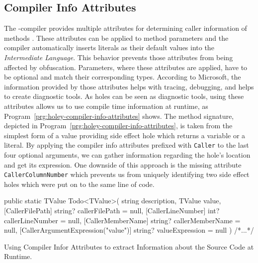 \subsection{Compiler Info Attributes}
\label{sec:holey-compiler-info-attributes}
The \CS-compiler provides multiple attributes for determining caller information of methods \cite{microsoft_attributes_2022}.
These attributes can be applied to method parameters and the compiler automatically inserts literals as their default values into the \emph{Intermediate Language}.
This behavior prevents those attributes from being affected by obfuscation.
Parameters, where these attributes are applied, have to be optional and match their corresponding types.
According to Microsoft, the information provided by those attributes helps with tracing, debugging, and helps to create diagnostic tools.
As holes can be seen as diagnostic tools, using these attributes allows us to use compile time information at runtime, as Program~\ref{prg:holey-compiler-info-attributes} shows.
The method signature, depicted in Program~\ref{prg:holey-compiler-info-attributes}, is taken from the simplest form of a value providing side effect hole which returns a variable or a literal.
By applying the compiler info attributes prefixed with \verb|Caller| to the last four optional arguments, we can gather information regarding the hole's location and get its expression.
One downside of this approach is the missing attribute \verb|CallerColumnNumber| which prevents us from uniquely identifying two side effect holes which were put on to the same line of code.

\begin{program}[ht]
\begin{CsCode}
public static TValue Todo<TValue>(
	string description,
	TValue value,
	[CallerFilePath] string? callerFilePath = null,
	[CallerLineNumber] int? callerLineNumber = null,
	[CallerMemberName] string? callerMemberName = null,
	[CallerArgumentExpression("value")] string? valueExpression = null
) { /*...*/ }
\end{CsCode}
\caption{Using Compiler Infor Attributes to extract Information about the Source Code at Runtime.}
\label{prg:holey-compiler-info-attributes}
\end{program}


